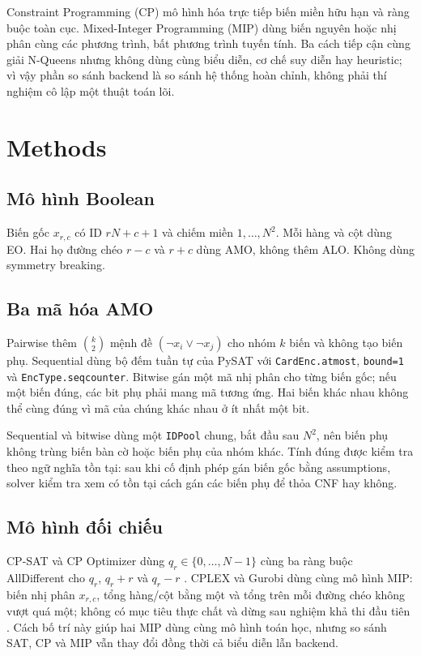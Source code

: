 \documentclass[a4paper,fleqn]{cas-sc}
\begin{document}
Constraint Programming (CP) mô hình hóa trực tiếp biến miền hữu hạn và ràng buộc toàn cục. Mixed-Integer Programming (MIP) dùng biến nguyên hoặc nhị phân cùng các phương trình, bất phương trình tuyến tính. Ba cách tiếp cận cùng giải N-Queens nhưng không dùng cùng biểu diễn, cơ chế suy diễn hay heuristic; vì vậy phần so sánh backend là so sánh hệ thống hoàn chỉnh, không phải thí nghiệm cô lập một thuật toán lõi.

\section{Methods}
\subsection{Mô hình Boolean}
Biến gốc $x_{r,c}$ có ID $rN+c+1$ và chiếm miền $1,\ldots,N^2$. Mỗi hàng và cột dùng EO. Hai họ đường chéo $r-c$ và $r+c$ dùng AMO, không thêm ALO. Không dùng symmetry breaking.

\subsection{Ba mã hóa AMO}
Pairwise thêm $\binom{k}{2}$ mệnh đề $(\neg x_i\lor\neg x_j)$ cho nhóm $k$ biến và không tạo biến phụ. Sequential dùng bộ đếm tuần tự của PySAT với \texttt{CardEnc.atmost}, \texttt{bound=1} và \texttt{EncType.seqcounter}. Bitwise gán một mã nhị phân cho từng biến gốc; nếu một biến đúng, các bit phụ phải mang mã tương ứng. Hai biến khác nhau không thể cùng đúng vì mã của chúng khác nhau ở ít nhất một bit.

Sequential và bitwise dùng một \texttt{IDPool} chung, bắt đầu sau $N^2$, nên biến phụ không trùng biến bàn cờ hoặc biến phụ của nhóm khác. Tính đúng được kiểm tra theo ngữ nghĩa tồn tại: sau khi cố định phép gán biến gốc bằng assumptions, solver kiểm tra xem có tồn tại cách gán các biến phụ để thỏa CNF hay không.

\subsection{Mô hình đối chiếu}
CP-SAT và CP Optimizer dùng $q_r\in\{0,\ldots,N-1\}$ cùng ba ràng buộc AllDifferent cho $q_r$, $q_r+r$ và $q_r-r$ \cite{ortools,ibmpip}. CPLEX và Gurobi dùng cùng mô hình MIP: biến nhị phân $x_{r,c}$, tổng hàng/cột bằng một và tổng trên mỗi đường chéo không vượt quá một; không có mục tiêu thực chất và dừng sau nghiệm khả thi đầu tiên \cite{ibmlicense,gurobi}. Cách bố trí này giúp hai MIP dùng cùng mô hình toán học, nhưng so sánh SAT, CP và MIP vẫn thay đổi đồng thời cả biểu diễn lẫn backend.
\end{document}
